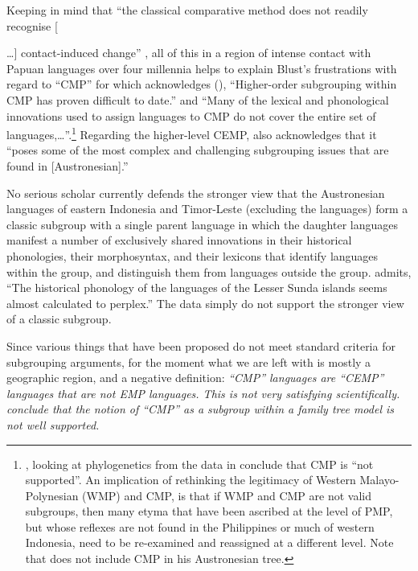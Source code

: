 Keeping in mind that “the classical comparative method
does not readily recognise [{\ldots] contact-induced change” \citep[49]{Ross1995},
all of this in a region of intense contact with Papuan languages over
four millennia helps to explain Blust’s frustrations with regard to
“CMP” for which \citeauthor{Blust2013} acknowledges (\citeyear[32]{Blust2013}),
“Higher-order subgrouping within CMP has proven difficult to date.”
and “Many of the lexical
and phonological innovations used to assign languages to
CMP do not cover the entire set of languages,…”.\footnote{
		\citet{GrayGreenhill2009},
		looking at phylogenetics from the data in 
		\citet{GreenhillGray2008} conclude that CMP is “not supported”.
		An implication of rethinking the legitimacy of
		Western Malayo-Polynesian (WMP) \citep{Smith2017b}
		and CMP, is that if WMP
		and CMP are not valid subgroups,
		then many etyma that have been ascribed at the level of PMP,
		but whose reflexes are not found in the Philippines or much of western Indonesia,
		need to be re-examined
		and reassigned at a different level.
		Note that \citet[754--756]{Blust2013}
		does not include CMP in his Austronesian tree.}
Regarding the higher-level CEMP,
\citet[75]{Blust2009} also acknowledges that it “poses some of the most complex
and challenging subgrouping issues that are found in [Austronesian].”

No serious scholar currently defends the stronger view that the
Austronesian languages of eastern Indonesia
and Timor-Leste (excluding the  languages)
form a classic subgroup with a single parent language in which the daughter
languages manifest a number of exclusively
shared innovations in their historical phonologies,
their morphosyntax,
and their lexicons that identify languages within the group,
and distinguish them from languages outside the group.
\citet[92]{Blust2008} admits,
“The historical phonology of the languages of
the Lesser Sunda islands seems almost calculated to perplex.”
The data simply do not support the stronger view of a classic subgroup.

Since various things that have been proposed do not meet standard criteria for subgrouping arguments,
for the moment what we are left with is mostly a geographic region,
and a negative definition: \it{“CMP” languages are “CEMP” languages that are not EMP languages}.
This is not very satisfying scientifically.
\citet{Grimes1991a,PawleyRoss1993,Ross1995,Ross2008,
Ross2017,GrayGreenhill2009,DonohueGrimes2008,Schapper2015,Klamer2019,Zobel2024}
conclude that the notion of “CMP” as a subgroup
within a family tree model is not well supported.

}
